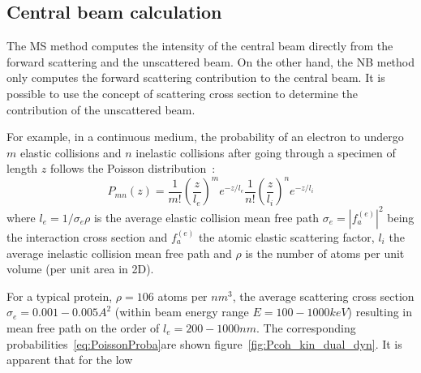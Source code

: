 \documentclass[a4paper,10pt]{article}
\begin{document}
\subsection{Central beam calculation}
The MS method computes the intensity of the central beam directly from the forward scattering and the unscattered beam. On the other hand, the NB method only computes the forward scattering contribution to the central beam.
It is possible to use the concept of scattering cross section to determine the contribution of the unscattered beam.


For example, in a continuous medium, the probability of an electron to undergo $m$ elastic collisions and $n$ inelastic collisions after going through a specimen of length $z$ follows the Poisson distribution~\cite{Latychevskaia2019}:
\begin{equation}\label{eq:PoissonProba}
  P_{mn}(z) =
    \frac{1}{m!}\left(\frac{z}{l_e}\right)^me^{-z/l_e}
    \frac{1}{n!}\left(\frac{z}{l_i}\right)^ne^{-z/l_i}
\end{equation}
where $l_e=1/\sigma_e\rho$ is the average elastic collision mean free path $\sigma_e=|f^{(e)}_a|^2$ being the interaction cross section and $f^{(e)}_a$ the atomic elastic scattering factor, $l_i$ the average inelastic collision mean free path and $\rho$ is the number of atoms per unit volume (per unit area in 2D).

For a typical protein, $\rho=106$ atoms per $nm^3$, the average scattering cross section $\sigma_e=0.001-0.005A^2$ (within beam energy range $E=100-1000keV$)  resulting in mean free path on the order of $l_e=200-1000nm$. The corresponding probabilities~\eqref{eq:PoissonProba}are shown figure~\ref{fig:Pcoh_kin_dual_dyn}. It is apparent that for the low 
\end{document}
